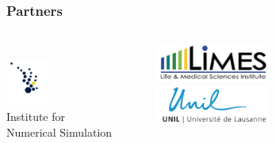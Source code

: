 \begin{frame}\frametitle{Partners}\vspace{1.0cm}

\begin{columns}[t]
	\centering \\
  \includegraphics[width=0.3\textwidth]{material/crop-cooperation-ins.png} \\\vspace{-0.5cm}
  \footnotesize{Institute for \\ Numerical Simulation}\vspace{0.3cm}



	\centering

  \includegraphics[width=0.45\textwidth]{material/crop-cooperation-limes.png}\\
	\vspace{1.75cm}
  \includegraphics[width=0.45\textwidth]{material/crop-cooperation-lausanne.png} \\

  \centering \\

\end{columns}

\end{frame}
